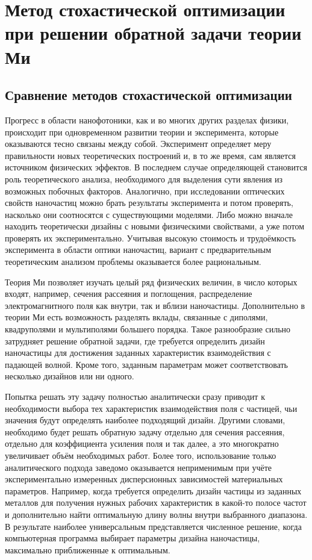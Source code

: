 \chapter{Метод стохастической оптимизации при решении обратной задачи
  теории Ми} \label{chapt2}

\section{Сравнение методов стохастической оптимизации}
\label{sec:construct-review}

Прогресс в области нанофотоники, как и во многих других разделах
физики, происходит при одновременном развитии теории и эксперимента,
которые оказываются тесно связаны между собой.  Эксперимент определяет
меру правильности новых теоретических построений и, в то же время, сам
является источником физических эффектов.  В последнем случае
определяющей становится роль теоретического анализа, необходимого для
выделения сути явления из возможных побочных факторов.  Аналогично,
при исследовании оптических свойств наночастиц можно брать результаты
эксперимента и потом проверять, насколько они соотносятся с
существующими моделями. Либо можно вначале находить теоретически
дизайны с новыми физическими свойствами, а уже потом проверять их
экспериментально.  Учитывая высокую стоимость и трудоёмкость
эксперимента в области оптики наночастиц, вариант с предварительным
теоретическим анализом проблемы оказывается более рациональным.

Теория Ми позволяет изучать целый ряд физических величин, в число
которых входят, например, сечения рассеяния и поглощения,
распределение электромагнитного поля как внутри, так и вблизи
наночастицы.  Дополнительно в теории Ми есть возможность разделять
вклады, связанные с диполями, квадруполями и
мультиполями большего порядка. Такое разнообразие сильно затрудняет
решение обратной задачи, где требуется определить дизайн наночастицы
для достижения заданных характеристик взаимодействия с падающей
волной. Кроме того, заданным параметрам может соответствовать
несколько дизайнов или ни одного.

Попытка решать эту задачу полностью аналитически сразу приводит к
необходимости выбора тех характеристик взаимодействия поля с частицей,
чьи значения будут определять наиболее подходящий дизайн. Другими
словами, необходимо будет решать обратную задачу отдельно для сечения
рассеяния, отдельно для коэффициента усиления поля и так далее, а это
многократно увеличивает объём необходимых работ. Более того,
использование только аналитического подхода заведомо оказывается
неприменимым при учёте экспериментально измеренных дисперсионных
зависимостей материальных параметров. Например, когда требуется
определить дизайн частицы из заданных металлов для получения нужных
рабочих характеристик в какой-то полосе частот и дополнительно
найти оптимальную длину волны внутри выбранного диапазона.  В
результате наиболее универсальным представляется численное решение,
когда компьютерная программа выбирает параметры дизайна наночастицы,
максимально приближенные к оптимальным.

